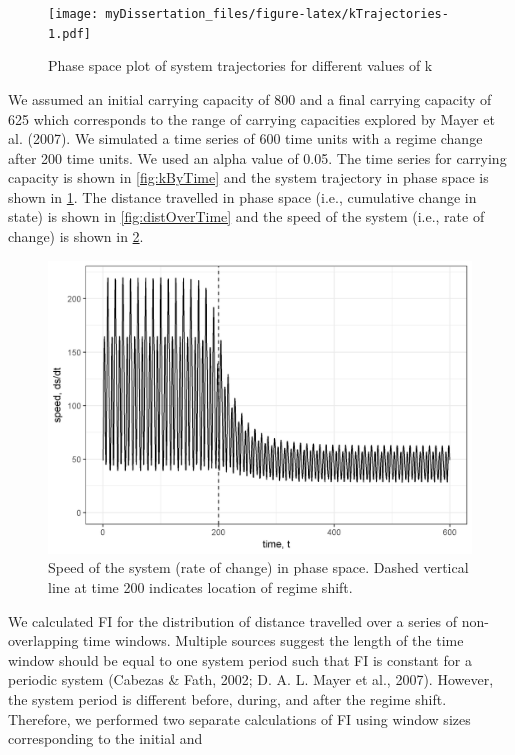 \documentclass[12pt,twoside]{reedthesis}
\begin{document}
\begin{figure}
\centering
\texttt{[image: myDissertation\_files/figure-latex/kTrajectories-1.pdf]}
\caption{\label{fig:kTrajectories}Phase space plot of system trajectories
for different values of k}
\end{figure}
We assumed an initial carrying capacity of 800 and a final carrying
capacity of 625 which corresponds to the range of carrying capacities
explored by Mayer et al. (2007). We simulated a time series of 600 time
units with a regime change after 200 time units. We used an alpha value
of 0.05. The time series for carrying capacity is shown in
\ref{fig:kByTime} and the system trajectory in phase space is shown in
\ref{fig:kTrajectories}. The distance travelled in phase space (i.e.,
cumulative change in state) is shown in \ref{fig:distOverTime} and the
speed of the system (i.e., rate of change) is shown in
\ref{fig:dsdtOverTime}.
\begin{figure}
\centering
\includegraphics{./chapterFiles/fiGuide/figures/dsdtOverTime.png}
\caption{\label{fig:dsdtOverTime}Speed of the system (rate of change) in
phase space. Dashed vertical line at time 200 indicates location of
regime shift.}
\end{figure}
We calculated FI for the distribution of distance travelled over a
series of non-overlapping time windows. Multiple sources suggest the
length of the time window should be equal to one system period such that
FI is constant for a periodic system (Cabezas \& Fath, 2002; D. A. L.
Mayer et al., 2007). However, the system period is different before,
during, and after the regime shift. Therefore, we performed two separate
calculations of FI using window sizes corresponding to the initial and
\end{document}
